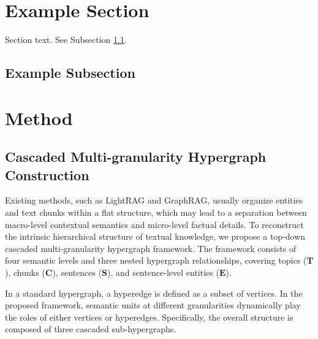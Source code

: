 \documentclass[preprint,12pt]{elsarticle}
\begin{document}


\section{Example Section}
\label{sec1}

Section text. See Subsection \ref{subsec1}.

\subsection{Example Subsection}
\label{subsec1}

\section{Method}

\subsection{Cascaded Multi-granularity Hypergraph Construction}

Existing methods, such as LightRAG and GraphRAG, usually organize entities and text chunks within a flat structure, which may lead to a separation between macro-level contextual semantics and micro-level factual details. To reconstruct the intrinsic hierarchical structure of textual knowledge, we propose a top-down cascaded multi-granularity hypergraph framework. The framework consists of four semantic levels and three nested hypergraph relationships, covering topics ($\mathbf{T}$), chunks ($\mathbf{C}$), sentences ($\mathbf{S}$), and sentence-level entities ($\mathbf{E}$).

In a standard hypergraph, a hyperedge is defined as a subset of vertices. In the proposed framework, semantic units at different granularities dynamically play the roles of either vertices or hyperedges. Specifically, the overall structure is composed of three cascaded sub-hypergraphs.
\end{document}
